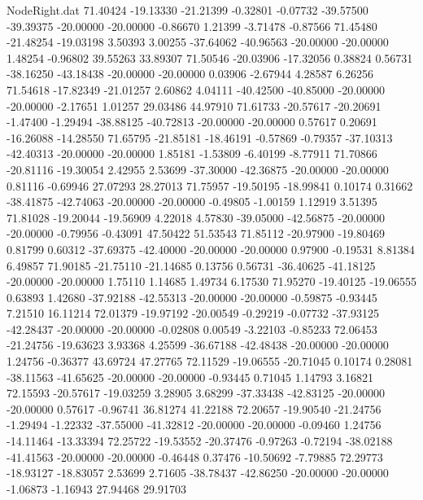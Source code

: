 \begin{filecontents}{NodeRight.dat}
  71.40424  -19.13330  -21.21399    -0.32801   -0.07732  -39.57500  -39.39375  -20.00000  -20.00000   -0.86670    1.21399   -3.71478   -0.87566
  71.45480  -21.48254  -19.03198     3.50393    3.00255  -37.64062  -40.96563  -20.00000  -20.00000    1.48254   -0.96802   39.55263   33.89307
  71.50546  -20.03906  -17.32056     0.38824    0.56731  -38.16250  -43.18438  -20.00000  -20.00000    0.03906   -2.67944    4.28587    6.26256
  71.54618  -17.82349  -21.01257     2.60862    4.04111  -40.42500  -40.85000  -20.00000  -20.00000   -2.17651    1.01257   29.03486   44.97910
  71.61733  -20.57617  -20.20691    -1.47400   -1.29494  -38.88125  -40.72813  -20.00000  -20.00000    0.57617    0.20691  -16.26088  -14.28550
  71.65795  -21.85181  -18.46191    -0.57869   -0.79357  -37.10313  -42.40313  -20.00000  -20.00000    1.85181   -1.53809   -6.40199   -8.77911
  71.70866  -20.81116  -19.30054     2.42955    2.53699  -37.30000  -42.36875  -20.00000  -20.00000    0.81116   -0.69946   27.07293   28.27013
  71.75957  -19.50195  -18.99841     0.10174    0.31662  -38.41875  -42.74063  -20.00000  -20.00000   -0.49805   -1.00159    1.12919    3.51395
  71.81028  -19.20044  -19.56909     4.22018    4.57830  -39.05000  -42.56875  -20.00000  -20.00000   -0.79956   -0.43091   47.50422   51.53543
  71.85112  -20.97900  -19.80469     0.81799    0.60312  -37.69375  -42.40000  -20.00000  -20.00000    0.97900   -0.19531    8.81384    6.49857
  71.90185  -21.75110  -21.14685     0.13756    0.56731  -36.40625  -41.18125  -20.00000  -20.00000    1.75110    1.14685    1.49734    6.17530
  71.95270  -19.40125  -19.06555     0.63893    1.42680  -37.92188  -42.55313  -20.00000  -20.00000   -0.59875   -0.93445    7.21510   16.11214
  72.01379  -19.97192  -20.00549    -0.29219   -0.07732  -37.93125  -42.28437  -20.00000  -20.00000   -0.02808    0.00549   -3.22103   -0.85233
  72.06453  -21.24756  -19.63623     3.93368    4.25599  -36.67188  -42.48438  -20.00000  -20.00000    1.24756   -0.36377   43.69724   47.27765
  72.11529  -19.06555  -20.71045     0.10174    0.28081  -38.11563  -41.65625  -20.00000  -20.00000   -0.93445    0.71045    1.14793    3.16821
  72.15593  -20.57617  -19.03259     3.28905    3.68299  -37.33438  -42.83125  -20.00000  -20.00000    0.57617   -0.96741   36.81274   41.22188
  72.20657  -19.90540  -21.24756    -1.29494   -1.22332  -37.55000  -41.32812  -20.00000  -20.00000   -0.09460    1.24756  -14.11464  -13.33394
  72.25722  -19.53552  -20.37476    -0.97263   -0.72194  -38.02188  -41.41563  -20.00000  -20.00000   -0.46448    0.37476  -10.50692   -7.79885
  72.29773  -18.93127  -18.83057     2.53699    2.71605  -38.78437  -42.86250  -20.00000  -20.00000   -1.06873   -1.16943   27.94468   29.91703

\end{filecontents}
